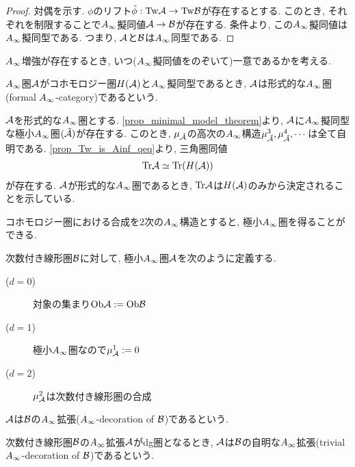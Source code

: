 \documentclass[uplatex, a4paper, 14Q, dvipdfmx]{jsarticle}
\begin{document}
\begin{proof}
  対偶を示す. 
  $\phi$のリフト$\tilde{\phi} : \mathrm{Tw}\mathcal{A} \to \mathrm{Tw}\mathcal{B}$が存在するとする.
  このとき, それぞれを制限することで$\Ainf$擬同値$\mathcal{A} \to \mathcal{B}$が存在する. 
  条件より, この$\Ainf$擬同値は$\Ainf$擬同型である.
  つまり, $\mathcal{A}$と$\mathcal{B}$は$\Ainf$同型である. 
\end{proof}

$\Ainf$増強が存在するとき, いつ($\Ainf$擬同値をのぞいて)一意であるかを考える. 

\begin{definition}
  $\Ainf$圏$\mathcal{A}$がコホモロジー圏$H(\mathcal{A})$と$\Ainf$擬同型であるとき, $\mathcal{A}$は形式的な$\Ainf$圏(formal $\Ainf$-category)であるという. 
\end{definition}

\begin{remark}
  $\mathcal{A}$を形式的な$\Ainf$圏とする.
  \cref{prop_minimal_model_theorem}より, $\mathcal{A}$に$\Ainf$擬同型な極小$\Ainf$圏$(\tilde{\mathcal{A}})$が存在する.
  このとき, $\mu_{\tilde{\mathcal{A}}}$の高次の$\Ainf$構造$\mu^3_{\tilde{\mathcal{A}}}, \mu^4_{\tilde{\mathcal{A}}}, \cdots$は全て自明である.
  \cref{prop_Tw_is_Ainf_qeq}より, 三角圏同値
  \begin{align*}
    \mathrm{Tr}\mathcal{A} \simeq \mathrm{Tr}(H(\mathcal{A}))
  \end{align*}
  が存在する.
  $\mathcal{A}$が形式的な$\Ainf$圏であるとき, $\mathrm{Tr}\mathcal{A}$は$H(\mathcal{A})$のみから決定されることを示している. 
\end{remark}

コホモロジー圏における合成を$2$次の$\Ainf$構造とすると, 極小$\Ainf$圏を得ることができる. 

\begin{definition}[$\Ainf$拡張]
  次数付き線形圏$\mathcal{B}$に対して, 極小$\Ainf$圏$\mathcal{A}$を次のように定義する.
  \begin{description}
    \item[($d=0$)] 対象の集まり$\mathrm{Ob}\mathcal{A} := \mathrm{Ob}\mathcal{B}$
    \item[($d=1$)] 極小$\Ainf$圏なので$\mu^1_{\mathcal{A}} := 0$
    \item[($d=2$)] $\mu^2_{\mathcal{A}}$は次数付き線形圏の合成
  \end{description}
  $\mathcal{A}$は$\mathcal{B}$の$\Ainf$拡張($\Ainf$-decoration of $\mathcal{B}$)であるという. 
\end{definition}

\begin{definition}
  次数付き線形圏$\mathcal{B}$の$\Ainf$拡張$\mathcal{A}$がdg圏となるとき, $\mathcal{A}$は$\mathcal{B}$の自明な$\Ainf$拡張(trivial $\Ainf$-decoration of $\mathcal{B}$)であるという. 
\end{definition}
\end{document}
